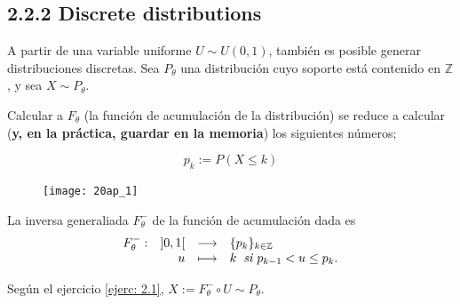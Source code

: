 \subsection{2.2.2 Discrete distributions}

A partir de una variable uniforme
$U \sim U(0,1)$, también es posible generar distribuciones
discretas. Sea $P_{\theta}$ una distribución cuyo 
soporte está contenido en $\mathbb{Z}$, y sea
$X \sim P_{\theta}$.


Calcular a $F_{\theta}$ (la función de acumulación
de la distribución) se reduce a calcular 
(\textbf{y, en la práctica, guardar en la memoria})
los siguientes números;

\begin{equation}
\label{eq0: 20Ap}
p_{k} := P(X \leq k)
\end{equation}

\begin{figure}[H]
	\centering
	\texttt{[image: 20ap\_1]} 
\end{figure}	

La inversa generaliada $F_{\theta}^{-}$ de la función
de acumulación dada es
\[
\text{${\begin{array}{crcl} F_{\theta}^{-}: & ]0,1[ & \longrightarrow & \{ p_{k} \}_{k \in \mathbb{Z}}  \\ \, & u & \longmapsto & 
k \hspace{0.2cm} \textit{si } p_{k-1} < u \leq p_{k}.
 \end{array}}$}
\]

Según el ejercicio \ref{ejerc: 2.1},
$X:= F^{-}_{\theta} \circ U \sim P_{\theta}$.
